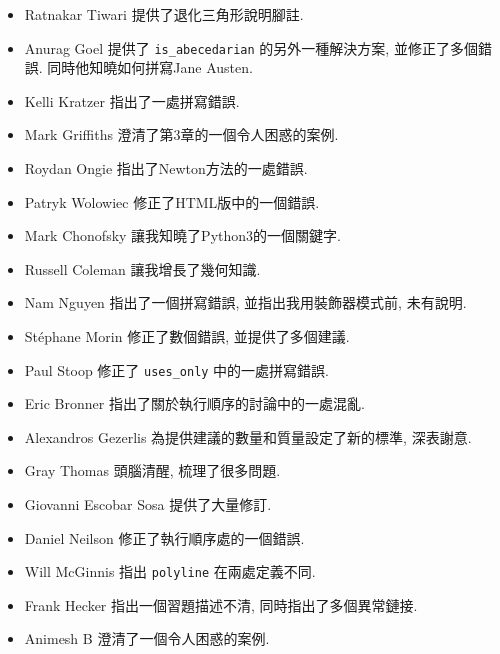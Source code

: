 \documentclass[10pt]{book}
\begin{document}
\begin{itemize}
\item Ratnakar Tiwari 提供了退化三角形說明腳註. 

\item Anurag Goel 提供了 \verb"is_abecedarian"
的另外一種解決方案, 並修正了多個錯誤. 同時他知曉如何拼寫Jane Austen. 

\item Kelli Kratzer 指出了一處拼寫錯誤. 

\item Mark Griffiths 澄清了第3章的一個令人困惑的案例. 

\item Roydan Ongie 指出了Newton方法的一處錯誤. 

\item Patryk Wolowiec 修正了HTML版中的一個錯誤. 

\item Mark Chonofsky 讓我知曉了Python3的一個關鍵字. 

\item Russell Coleman 讓我增長了幾何知識. 

\item Nam Nguyen 指出了一個拼寫錯誤, 並指出我用裝飾器模式前, 未有說明. 

\item St\'{e}phane Morin 修正了數個錯誤, 並提供了多個建議. 

\item Paul Stoop 修正了 \verb+uses_only+ 中的一處拼寫錯誤. 

\item Eric Bronner 指出了關於執行順序的討論中的一處混亂. 

\item Alexandros Gezerlis 為提供建議的數量和質量設定了新的標準, 深表謝意. 

\item Gray Thomas 頭腦清醒, 梳理了很多問題.

\item Giovanni Escobar Sosa 提供了大量修訂. 

\item Daniel Neilson 修正了執行順序處的一個錯誤. 

\item Will McGinnis 指出 {\tt polyline} 在兩處定義不同. 

\item Frank Hecker 指出一個習題描述不清, 同時指出了多個異常鏈接. 

\item Animesh B 澄清了一個令人困惑的案例. 


\end{itemize}
\end{document}
